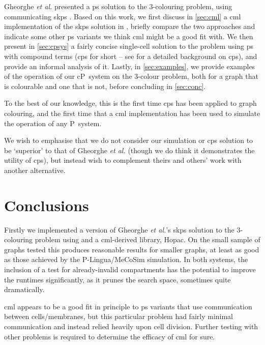 Gheorghe \textit{et al.} presented a \gls{ps} solution to the 3-colouring problem, using communicating \gls{skps} \cite{Gheorghe2013}.  Based on this work, we first discuss in \autoref{sec:cml} a \gls{cml} implementation of the \gls{skps} solution in \cite{Gheorghe2013}, briefly compare the two approaches and indicate some other \gls{ps} variants we think \gls{cml} might be a good fit with.  We then present in \autoref{sec:cpsys} a fairly concise single-cell solution to the problem using \gls{ps} with compound terms (\gls{cps} for short -- see \cite{Nicolescu2018} for a detailed background on \gls{cps}), and provide an informal analysis of it.  Lastly, in \autoref{sec:examples}, we provide examples of the operation of our cP~system on the 3-colour problem, both for a graph that is colourable and one that is not, before concluding in \autoref{sec:conc}.

To the best of our knowledge, this is the first time \gls{cps} has been applied to graph colouring, and the first time that a \gls{cml} implementation has been used to simulate the operation of any P~system.

We wish to emphasise that we do not consider our simulation or \gls{cps} solution to be `superior' to that of Gheorghe \textit{et al.} (though we do think it demonstrates the utility of \gls{cps}), but instead wish to complement theirs and others' work with another alternative.





\section{\label{sec:conc}Conclusions}
Firstly we implemented a version of Gheorghe \textit{et al.}'s \gls{skps} solution to the 3-colouring problem using \fsharp{} and a \gls{cml}-derived library, Hopac.   On the small sample of graphs tested this produces reasonable results for smaller graphs, at least as good as those achieved by the P-Lingua/MeCoSim simulation.  In both systems, the inclusion of a test for already-invalid compartments has the potential to improve the runtimes significantly, as it prunes the search space, sometimes quite dramatically.

\gls{cml} appears to be a good fit in principle to \gls{ps} variants that use communication between cells/membranes, but this particular problem had fairly minimal communication and instead relied heavily upon cell division.  Further testing with other problems is required to determine the efficacy of \gls{cml} for sure.

